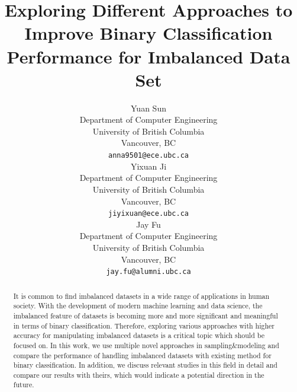 \documentclass{article}
\title{Exploring Different Approaches to Improve Binary Classification Performance for Imbalanced Data Set}
\author{%
  Yuan Sun\\
  Department of Computer Engineering\\
  University of British Columbia\\
  Vancouver, BC\\
  \texttt{anna9501@ece.ubc.ca}\\
  \And
  Yixuan Ji\\
  Department of Computer Engineering\\
  University of British Columbia\\
  Vancouver, BC\\
  \texttt{jiyixuan@ece.ubc.ca}\\
  \AND
  Jay Fu\\
  Department of Computer Engineering\\
  University of British Columbia\\
  Vancouver, BC\\
  \texttt{jay.fu@alumni.ubc.ca}\\
}
\begin{document}

\maketitle

\begin{abstract}
It is common to find imbalanced datasets in a wide range of applications in human society. With the development of modern machine learning and data science, the imbalanced feature of datasets is becoming more and more significant and meaningful in terms of binary classification. Therefore, exploring various approaches with higher accuracy for manipulating imbalanced datasets is a critical topic which should be focused on. In this work, we use multiple novel approaches in sampling\&modeling and compare the performance of handling imbalanced datasets with existing method for binary classification. In addition, we discuss relevant studies in this field in detail and compare our results with theirs, which would indicate a potential direction in the future.
\end{abstract}
\end{document}
